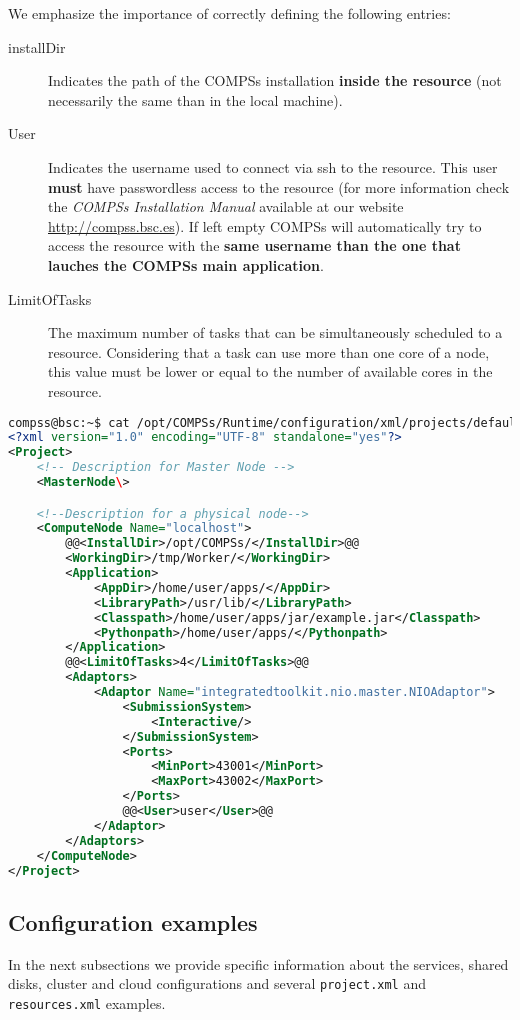 We emphasize the importance of correctly defining the following entries:
\begin{description}
 \item [installDir] Indicates the path of the COMPSs installation \textbf{inside the resource} (not necessarily the same 
 than in the local machine).
 \item [User] Indicates the username used to connect via ssh to the resource. This user \textbf{must} have passwordless access to the
 resource (for more information check the \textit{COMPSs Installation Manual} available at our website \url{http://compss.bsc.es}).
 If left empty COMPSs will automatically try to access the resource with the \textbf{same username than the one that lauches 
 the COMPSs main application}.
 \item [LimitOfTasks] The maximum number of tasks that can be simultaneously scheduled to a resource. Considering that a task 
 can use more than one core of a node, this value must be lower or equal to the number of available cores in the resource. 
\end{description}


\begin{lstlisting}[language=xml,moredelim={[is][\textcolor{red}]{@@}{@@}}]
compss@bsc:~$ cat /opt/COMPSs/Runtime/configuration/xml/projects/default_project.xml
<?xml version="1.0" encoding="UTF-8" standalone="yes"?>
<Project>
    <!-- Description for Master Node --> 
    <MasterNode\>

    <!--Description for a physical node-->
    <ComputeNode Name="localhost">
        @@<InstallDir>/opt/COMPSs/</InstallDir>@@
        <WorkingDir>/tmp/Worker/</WorkingDir>
        <Application>
            <AppDir>/home/user/apps/</AppDir>
            <LibraryPath>/usr/lib/</LibraryPath>
            <Classpath>/home/user/apps/jar/example.jar</Classpath>
            <Pythonpath>/home/user/apps/</Pythonpath>
        </Application>
        @@<LimitOfTasks>4</LimitOfTasks>@@
        <Adaptors>
            <Adaptor Name="integratedtoolkit.nio.master.NIOAdaptor">
                <SubmissionSystem>
                    <Interactive/>
                </SubmissionSystem>
                <Ports>
                    <MinPort>43001</MinPort>
                    <MaxPort>43002</MaxPort>
                </Ports>
                @@<User>user</User>@@
            </Adaptor>
        </Adaptors>
    </ComputeNode>
</Project>
\end{lstlisting}
\label{lstlisting:project.xml}


\subsection{Configuration examples}
In the next subsections we provide specific information about the services, shared disks, cluster and cloud configurations and 
several \texttt{project.xml} and \texttt{resources.xml} examples. 


